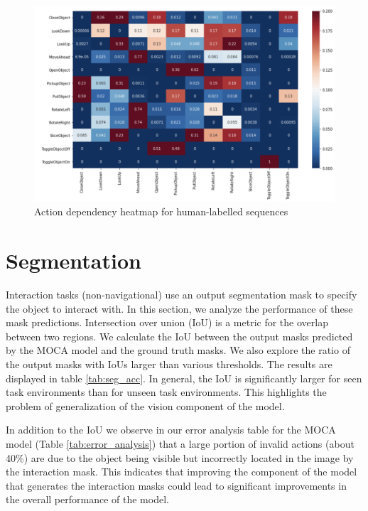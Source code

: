 \documentclass[11pt,a4paper]{article}
\begin{document}
 \begin{figure}
    \centering
    \includegraphics[width=\linewidth]{Reports/4-Analysis-of-Baselines/GROUND_codep.png}
    \caption{Action dependency heatmap for human-labelled sequences}
    \label{fig:GROUND_codep}
\end{figure}



\section{Segmentation}

Interaction tasks (non-navigational) use an output segmentation mask to specify the object to interact with. In this section, we analyze the performance of these mask predictions. Intersection over union (IoU) is a metric for the overlap between two regions. We calculate the IoU between the output masks predicted by the MOCA model and the ground truth masks. We also explore the ratio of the output masks with IoUs larger than various thresholds. The results are displayed in table \ref{tab:seg_acc}. In general, the IoU is significantly larger for seen task environments than for unseen task environments. This highlights the problem of generalization of the vision component of the model.

In addition to the IoU we observe in our error analysis table for the MOCA model (Table \ref{tab:error_analysis}) that a large portion of invalid actions (about 40\%) are due to the object being visible but incorrectly located in the image by the interaction mask. This indicates that improving the component of the model that generates the interaction masks could lead to significant improvements in the overall performance of the model.
\end{document}
